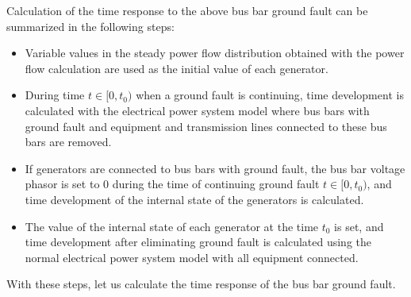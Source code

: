 \documentclass[graybox, envcountchap]{svmult}
\begin{document}
Calculation of the time response to the above bus bar ground fault can be summarized in the following steps:

\medskip
\begin{breakbox}
\begin{itemize}
\item[(a)] Variable values in the steady power flow distribution obtained with the power flow calculation are used as the initial value of each generator. 
\item[(b)] During time $ t \in [0, t_0)$ when a ground fault is continuing, time development is calculated with the electrical power system model where bus bars with ground fault and equipment and transmission lines connected to these bus bars are removed.
\item[(c)] If generators are connected to bus bars with ground fault, the bus bar voltage phasor is set to 0 during the time of continuing ground fault $ t \in [0, t_0)$, and time development of the internal state of the generators is calculated.
\item[(d)] The value of the internal state of each generator at the time $t_0$ is set, and time development after eliminating ground fault is calculated using the normal electrical power system model with all equipment connected. 
\end{itemize}
\end{breakbox}
\medskip


With these steps, let us calculate the time response of the bus bar ground fault.
\end{document}
